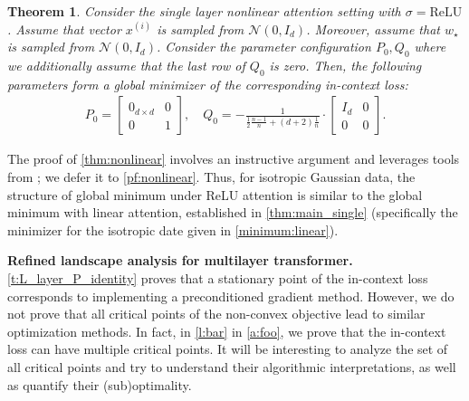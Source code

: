 \documentclass{article}
\newtheorem{theorem}{Theorem}
\newcommand{\wstar}{w_\star}
\newcommand{\tx}[1]{x^{(#1)}}
\begin{document}
\begin{theorem} \label{thm:nonlinear} 
Consider the single layer nonlinear attention setting with  $\sigma = \mathrm{ReLU}$.
Assume that vector $\tx{i}$ is sampled from $\mathcal{N}(0, I_{d})$. 
Moreover, assume that  $\wstar$ is sampled  from $\mathcal{N}(0, I_d)$.  
Consider the parameter configuration $P_0,Q_0$  where we additionally assume that the last row of $Q_0$ is zero. 
Then, the following parameters form a global minimizer of the corresponding in-context loss:
    \begin{align}  
P_0 = \begin{bmatrix}
0_{d\times d} & 0 \\ 
0 & 1 
\end{bmatrix} ,\quad Q_0 = -\frac{1}{\frac{1}{2}\frac{n-1}{n}+(d+2)\frac{1}{n}} \cdot \begin{bmatrix}
 I_d & 0\\
0  & 0
\end{bmatrix} .
\end{align} 
\end{theorem}
The proof of \autoref{thm:nonlinear}  involves an instructive argument and leverages tools from \citep{erdogdu2016scaled}; we defer it to \autoref{pf:nonlinear}. Thus, for isotropic Gaussian data, the structure of global minimum under ReLU attention is similar to the global minimum with linear attention, established in \autoref{thm:main_single} (specifically the minimizer for the isotropic date given in \eqref{minimum:linear}). 

 

\textbf{Refined landscape analysis for multilayer transformer.} \autoref{t:L_layer_P_identity}   proves that a stationary point of the in-context loss corresponds to  implementing a preconditioned gradient method. However, we do not prove that all critical points of the non-convex objective lead to similar optimization methods. In fact, in \autoref{l:bar} in   \autoref{a:foo}, we prove that the in-context loss can have multiple critical points. It will be interesting to analyze the set of all critical points and try to understand their algorithmic interpretations, as well as quantify their (sub)optimality.
\end{document}
